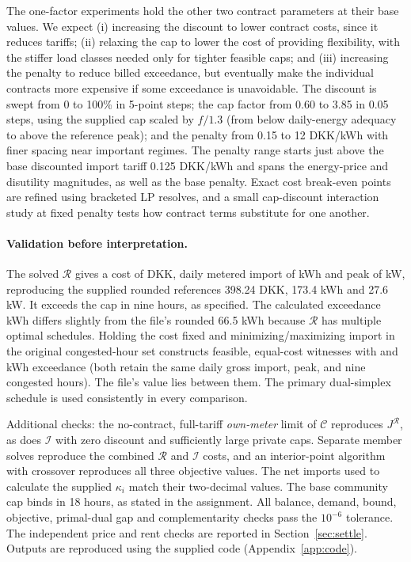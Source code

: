 \documentclass[10pt,a4paper]{article}
\newcommand{\Rmod}{\mathcal R}
\newcommand{\Imod}{\mathcal I}
\newcommand{\Cmod}{\mathcal C}
\begin{document}
The one-factor experiments hold the other two contract parameters at their base values. We expect (i) increasing the discount to lower contract costs, since it reduces tariffs; (ii) relaxing the cap to lower the cost of providing flexibility, with the stiffer load classes needed only for tighter feasible caps; and (iii) increasing the penalty to reduce billed exceedance, but eventually make the individual contracts more expensive if some exceedance is unavoidable. The discount is swept from 0 to 100\% in 5-point steps; the cap factor from 0.60 to 3.85 in 0.05 steps, using the supplied cap scaled by $f/1.3$ (from below daily-energy adequacy to above the reference peak); and the penalty from 0.15 to 12 DKK/kWh with finer spacing near important regimes. The penalty range starts just above the base discounted import tariff 0.125 DKK/kWh and spans the energy-price and disutility magnitudes, as well as the base penalty. Exact cost break-even points are refined using bracketed LP resolves, and a small cap-discount interaction study at fixed penalty tests how contract terms substitute for one another.

\paragraph{Validation before interpretation.}
The solved $\Rmod$ gives a cost of \Rcost{} DKK, daily metered import of \Rimp{} kWh and peak of \Rpeak{} kW, reproducing the supplied rounded references 398.24 DKK, 173.4 kWh and 27.6 kW. It exceeds the cap in nine hours, as specified. The calculated exceedance \Rex{} kWh differs slightly from the file's rounded 66.5 kWh because $\Rmod$ has multiple optimal schedules. Holding the cost fixed and minimizing/maximizing import in the original congested-hour set constructs feasible, equal-cost witnesses with \RtieLo{} and \RtieHi{} kWh exceedance (both retain the same daily gross import, peak, and nine congested hours). The file's value lies between them. The primary dual-simplex schedule is used consistently in every comparison.

Additional checks: the no-contract, full-tariff \emph{own-meter} limit of $\Cmod$ reproduces $J^\Rmod$, as does $\Imod$ with zero discount and sufficiently large private caps. Separate member solves reproduce the combined $\Rmod$ and $\Imod$ costs, and an interior-point algorithm with crossover reproduces all three objective values. The net imports used to calculate the supplied $\kappa_i$ match their two-decimal values. The base community cap binds in 18 hours, as stated in the assignment. All balance, demand, bound, objective, primal-dual gap and complementarity checks pass the $10^{-6}$ tolerance. The independent price and rent checks are reported in Section~\ref{sec:settle}. Outputs are reproduced using the supplied code (Appendix~\ref{app:code}).
\end{document}
